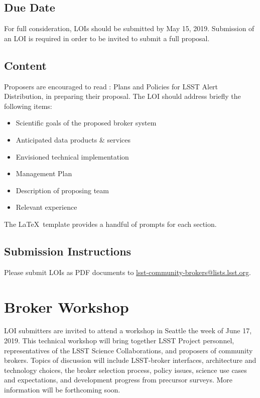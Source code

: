 \documentclass[DM,toc]{lsstdoc}
\begin{document}
\subsection{Due Date}

For full consideration, LOIs should be submitted by May 15, 2019.
Submission of an LOI is required in order to be invited to submit a full proposal.

\subsection{Content}


Proposers are encouraged to read : Plans and Policies for LSST Alert Distribution, in preparing their proposal. 
The LOI should address briefly the following items:

\begin{itemize}
	\item Scientific goals of the proposed broker system
	\item Anticipated data products \& services
	\item Envisioned technical implementation
	\item Management Plan
	\item Description of proposing team
	\item Relevant experience 
\end{itemize}

The \LaTeX\ template provides a handful of prompts for each section.

\subsection{Submission Instructions}

Please submit LOIs as PDF documents to \url{lsst-community-brokers@lists.lsst.org}.

\section{Broker Workshop}


LOI submitters are invited to attend a workshop in Seattle the week of June 17, 2019.
This technical workshop will bring together LSST Project personnel, representatives of the LSST Science Collaborations, and proposers of community brokers.  
Topics of discussion will include LSST-broker interfaces, architecture and technology choices, the broker selection process, policy issues, science use cases and expectations, and development progress from precursor surveys.
More information will be forthcoming soon.
\end{document}
